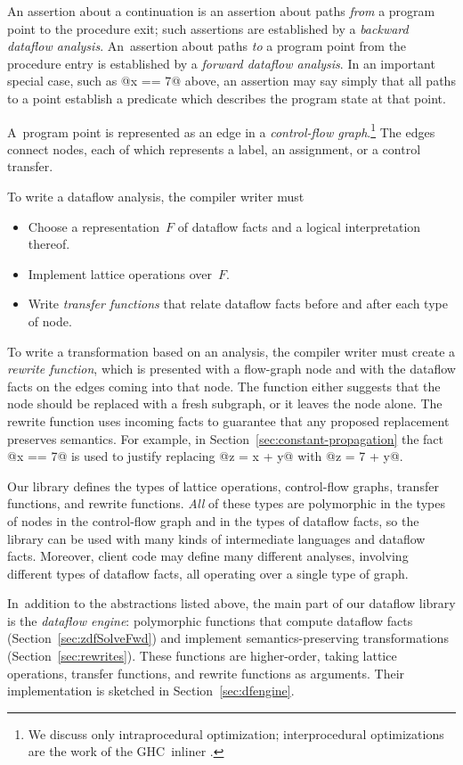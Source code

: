 \documentclass[blockstyle,preprint,nocopyrightspace]{sigplanconf}
\let\cite\citep
\newcommand\secref[1]{Section~\ref{sec:#1}}
\begin{document}
An assertion about a continuation is an assertion about paths
\emph{from} a program point 
to the procedure {exit};
such assertions are established by a \emph{backward dataflow analysis}.
An~assertion about paths \emph{to} a program point from the procedure
{entry} is established by a \emph{forward dataflow analysis}.
In an important special case, such as @x == 7@ above,
an assertion may say simply
that all paths to a point establish a predicate which describes the program
state at that point. 

A~program point is represented as an edge in
a \emph{control-flow graph}.\footnote
{We discuss only intraprocedural optimization;
interprocedural optimizations are the work of the GHC~inliner
\cite{peyton-jones:secrets-inliner}.} 
The edges connect nodes, each of which represents a label, an assignment, or
a control transfer.

To write a dataflow analysis, the compiler
writer must 
\begin{itemize}
\item
Choose a representation~$F$ of dataflow facts and a logical interpretation
thereof.
\item
Implement lattice operations over~$F$.
\item
Write \emph{transfer functions} that relate dataflow facts before and
after each type of node.
\end{itemize}

To write a transformation based on an analysis, the compiler writer
must create a \emph{rewrite function}, which is presented with a
flow-graph node and with the dataflow facts on the edges coming
into that node.
The function either suggests that the node should be replaced with a
fresh subgraph, or it leaves the node alone.
The rewrite function uses incoming facts to guarantee that
any proposed replacement preserves semantics.
For example, in \secref{constant-propagation} the fact @x == 7@ is
used to justify replacing @z = x + y@ with @z = 7 + y@.

Our library defines the types of lattice operations,
control-flow graphs, transfer functions, and rewrite functions.
\emph{All} of these types are polymorphic in the types of
nodes in the control-flow graph and in the types of dataflow facts, so
the library can be used with many kinds of intermediate languages and
dataflow facts.
Moreover, client code may define many different analyses, involving
different types of dataflow facts, all operating over a single type of
graph. 

In~addition to the abstractions listed above, the main part of our
dataflow library is the \emph{dataflow engine}:  
polymorphic functions that compute 
dataflow facts (\secref{zdfSolveFwd}) and implement
semantics-preserving transformations (\secref{rewrites}).
These functions are higher-order, taking lattice operations, transfer
functions, and rewrite functions as arguments.
Their implementation is sketched in \secref{dfengine}.
\end{document}
